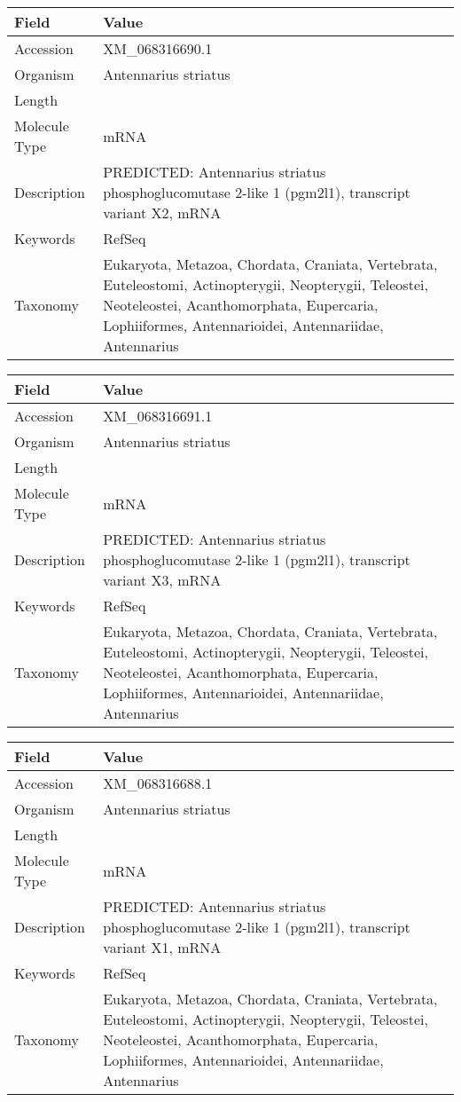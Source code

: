 \documentclass[10pt]{article}
\begin{document}
{\footnotesize
\begin{longtable}{>{\raggedright\arraybackslash}p{4.5cm} >{\raggedright\arraybackslash}p{11.5cm}}
\textbf{Field} & \textbf{Value} \\
\hline
Accession & XM\_068316690.1 \\
Organism & Antennarius striatus \\
Length & 2929 \\
Molecule Type & mRNA \\
Description & PREDICTED: Antennarius striatus phosphoglucomutase 2-like 1 (pgm2l1), transcript variant X2, mRNA \\
Keywords & RefSeq \\
Taxonomy & Eukaryota, Metazoa, Chordata, Craniata, Vertebrata, Euteleostomi, Actinopterygii, Neopterygii, Teleostei, Neoteleostei, Acanthomorphata, Eupercaria, Lophiiformes, Antennarioidei, Antennariidae, Antennarius \\
\end{longtable}
}

{\footnotesize
\begin{longtable}{>{\raggedright\arraybackslash}p{4.5cm} >{\raggedright\arraybackslash}p{11.5cm}}
\textbf{Field} & \textbf{Value} \\
\hline
Accession & XM\_068316691.1 \\
Organism & Antennarius striatus \\
Length & 2761 \\
Molecule Type & mRNA \\
Description & PREDICTED: Antennarius striatus phosphoglucomutase 2-like 1 (pgm2l1), transcript variant X3, mRNA \\
Keywords & RefSeq \\
Taxonomy & Eukaryota, Metazoa, Chordata, Craniata, Vertebrata, Euteleostomi, Actinopterygii, Neopterygii, Teleostei, Neoteleostei, Acanthomorphata, Eupercaria, Lophiiformes, Antennarioidei, Antennariidae, Antennarius \\
\end{longtable}
}

{\footnotesize
\begin{longtable}{>{\raggedright\arraybackslash}p{4.5cm} >{\raggedright\arraybackslash}p{11.5cm}}
\textbf{Field} & \textbf{Value} \\
\hline
Accession & XM\_068316688.1 \\
Organism & Antennarius striatus \\
Length & 3033 \\
Molecule Type & mRNA \\
Description & PREDICTED: Antennarius striatus phosphoglucomutase 2-like 1 (pgm2l1), transcript variant X1, mRNA \\
Keywords & RefSeq \\
Taxonomy & Eukaryota, Metazoa, Chordata, Craniata, Vertebrata, Euteleostomi, Actinopterygii, Neopterygii, Teleostei, Neoteleostei, Acanthomorphata, Eupercaria, Lophiiformes, Antennarioidei, Antennariidae, Antennarius \\
\end{longtable}
}
\end{document}

